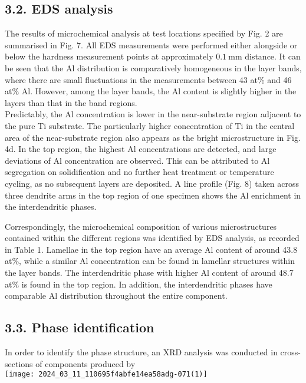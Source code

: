 \documentclass[10pt]{article}
\begin{document}
\subsection*{3.2. EDS analysis}
The results of microchemical analysis at test locations specified by Fig. 2 are summarised in Fig. 7. All EDS measurements were performed either alongside or below the hardness measurement points at approximately $0.1 \mathrm{~mm}$ distance. It can be seen that the $\mathrm{Al}$ distribution is comparatively homogeneous in the layer bands, where there are small fluctuations in the measurements between 43 at\% and 46 at\% Al. However, among the layer bands, the $\mathrm{Al}$ content is slightly higher in the layers than that in the band regions.\\
Predictably, the $\mathrm{Al}$ concentration is lower in the near-substrate region adjacent to the pure Ti substrate. The particularly higher concentration of $\mathrm{Ti}$ in the central area of the near-substrate region also appears as the bright microstructure in Fig. 4d. In the top region, the highest $\mathrm{Al}$ concentrations are detected, and large deviations of $\mathrm{Al}$ concentration are observed. This can be attributed to Al segregation on solidification and no further heat treatment or temperature cycling, as no subsequent layers are deposited. A line profile (Fig. 8) taken across three dendrite arms in the top region of one specimen shows the $\mathrm{Al}$ enrichment in the interdendritic phases.

Correspondingly, the microchemical composition of various microstructures contained within the different regions was identified by EDS analysis, as recorded in Table 1. Lamellae in the top region have an average $\mathrm{Al}$ content of around 43.8 at\%, while a similar $\mathrm{Al}$ concentration can be found in lamellar structures within the layer bands. The interdendritic phase with higher $\mathrm{Al}$ content of around 48.7 at\% is found in the top region. In addition, the interdendritic phases have comparable $\mathrm{Al}$ distribution throughout the entire component.

\subsection*{3.3. Phase identification}
In order to identify the phase structure, an XRD analysis was conducted in cross-sections of components produced by\\
\texttt{[image: 2024\_03\_11\_110695f4abfe14ea58adg-071(1)]}
\end{document}
